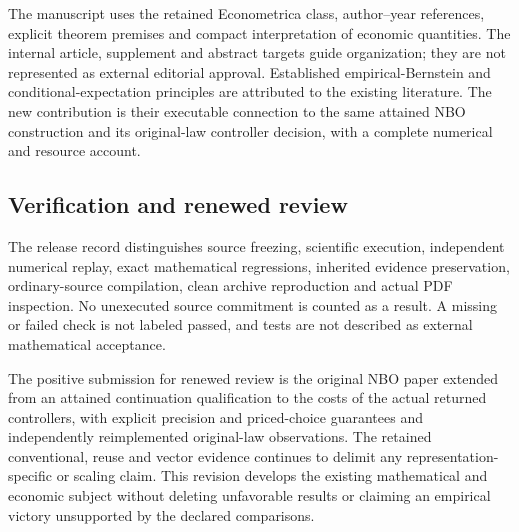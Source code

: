 \documentclass[ecta,nameyear,draft]{econsocart}
\begin{document}
The manuscript uses the retained Econometrica class, author--year
references, explicit theorem premises and compact interpretation of
economic quantities. The internal article, supplement and abstract
targets guide organization; they are not represented as external
editorial approval. Established empirical-Bernstein and
conditional-expectation principles are attributed to the existing
literature. The new contribution is their executable connection to the
same attained NBO construction and its original-law controller decision,
with a complete numerical and resource account.

\hypertarget{verification-and-renewed-review}{%
\subsection{Verification and renewed
review}\label{verification-and-renewed-review}}

The release record distinguishes source freezing, scientific execution,
independent numerical replay, exact mathematical regressions, inherited
evidence preservation, ordinary-source compilation, clean archive
reproduction and actual PDF inspection. No unexecuted source commitment
is counted as a result. A missing or failed check is not labeled passed,
and tests are not described as external mathematical acceptance.

The positive submission for renewed review is the original NBO paper
extended from an attained continuation qualification to the costs of the
actual returned controllers, with explicit precision and priced-choice
guarantees and independently reimplemented original-law observations.
The retained conventional, reuse and vector evidence continues to
delimit any representation-specific or scaling claim. This revision
develops the existing mathematical and economic subject without deleting
unfavorable results or claiming an empirical victory unsupported by the
declared comparisons.
\end{document}
